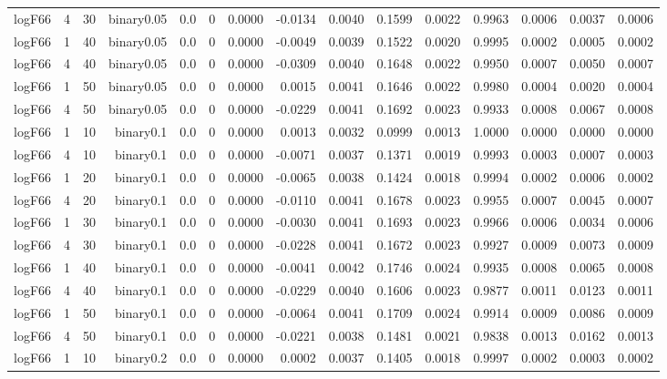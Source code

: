 \begin{longtable}{rrrrrrrrrrrrrrr}
  logF66 & 4 & 30 & binary0.05 & 0.0 & 0 & 0.0000 & -0.0134 & 0.0040 & 0.1599 & 0.0022 & 0.9963 & 0.0006 & 0.0037 & 0.0006 \\ 
  logF66 & 1 & 40 & binary0.05 & 0.0 & 0 & 0.0000 & -0.0049 & 0.0039 & 0.1522 & 0.0020 & 0.9995 & 0.0002 & 0.0005 & 0.0002 \\ 
  logF66 & 4 & 40 & binary0.05 & 0.0 & 0 & 0.0000 & -0.0309 & 0.0040 & 0.1648 & 0.0022 & 0.9950 & 0.0007 & 0.0050 & 0.0007 \\ 
  logF66 & 1 & 50 & binary0.05 & 0.0 & 0 & 0.0000 & 0.0015 & 0.0041 & 0.1646 & 0.0022 & 0.9980 & 0.0004 & 0.0020 & 0.0004 \\ 
  logF66 & 4 & 50 & binary0.05 & 0.0 & 0 & 0.0000 & -0.0229 & 0.0041 & 0.1692 & 0.0023 & 0.9933 & 0.0008 & 0.0067 & 0.0008 \\ 
  logF66 & 1 & 10 & binary0.1 & 0.0 & 0 & 0.0000 & 0.0013 & 0.0032 & 0.0999 & 0.0013 & 1.0000 & 0.0000 & 0.0000 & 0.0000 \\ 
  logF66 & 4 & 10 & binary0.1 & 0.0 & 0 & 0.0000 & -0.0071 & 0.0037 & 0.1371 & 0.0019 & 0.9993 & 0.0003 & 0.0007 & 0.0003 \\ 
  logF66 & 1 & 20 & binary0.1 & 0.0 & 0 & 0.0000 & -0.0065 & 0.0038 & 0.1424 & 0.0018 & 0.9994 & 0.0002 & 0.0006 & 0.0002 \\ 
  logF66 & 4 & 20 & binary0.1 & 0.0 & 0 & 0.0000 & -0.0110 & 0.0041 & 0.1678 & 0.0023 & 0.9955 & 0.0007 & 0.0045 & 0.0007 \\ 
  logF66 & 1 & 30 & binary0.1 & 0.0 & 0 & 0.0000 & -0.0030 & 0.0041 & 0.1693 & 0.0023 & 0.9966 & 0.0006 & 0.0034 & 0.0006 \\ 
  logF66 & 4 & 30 & binary0.1 & 0.0 & 0 & 0.0000 & -0.0228 & 0.0041 & 0.1672 & 0.0023 & 0.9927 & 0.0009 & 0.0073 & 0.0009 \\ 
  logF66 & 1 & 40 & binary0.1 & 0.0 & 0 & 0.0000 & -0.0041 & 0.0042 & 0.1746 & 0.0024 & 0.9935 & 0.0008 & 0.0065 & 0.0008 \\ 
  logF66 & 4 & 40 & binary0.1 & 0.0 & 0 & 0.0000 & -0.0229 & 0.0040 & 0.1606 & 0.0023 & 0.9877 & 0.0011 & 0.0123 & 0.0011 \\ 
  logF66 & 1 & 50 & binary0.1 & 0.0 & 0 & 0.0000 & -0.0064 & 0.0041 & 0.1709 & 0.0024 & 0.9914 & 0.0009 & 0.0086 & 0.0009 \\ 
  logF66 & 4 & 50 & binary0.1 & 0.0 & 0 & 0.0000 & -0.0221 & 0.0038 & 0.1481 & 0.0021 & 0.9838 & 0.0013 & 0.0162 & 0.0013 \\ 
  logF66 & 1 & 10 & binary0.2 & 0.0 & 0 & 0.0000 & 0.0002 & 0.0037 & 0.1405 & 0.0018 & 0.9997 & 0.0002 & 0.0003 & 0.0002 \\ 

\end{longtable}
